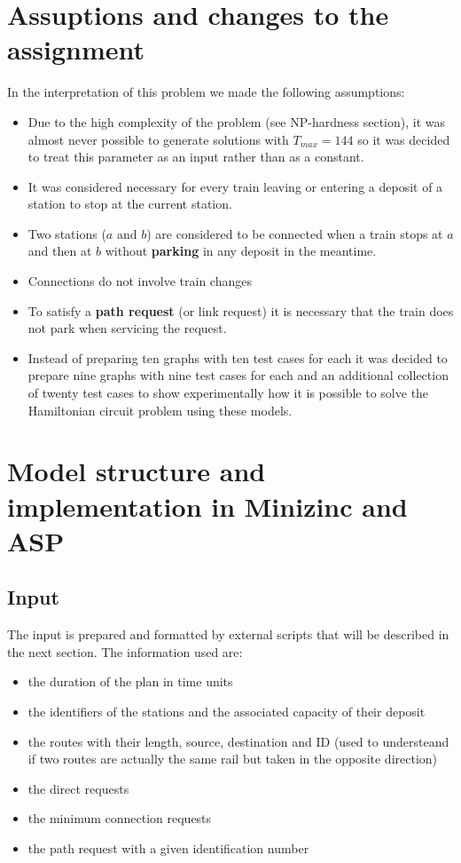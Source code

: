 \documentclass[11pt]{article}
\begin{document}
\section{Assuptions and changes to the assignment}
In the interpretation of this problem we made the following assumptions:
\begin{itemize}
\item Due to the high complexity of the problem (see NP-hardness section), it was
almost never possible to generate solutions with $T_{max}=144$ so it was decided
to treat this parameter as an input rather than as a constant.
 
\item It was considered necessary for every train leaving or entering a deposit of a station
to stop at the current station. 
\item Two stations ($a$ and $b$) are considered to be connected when a train stops at $a$
and then at $b$ without \textbf{parking} in any deposit in the meantime.
\item Connections do not involve train changes
\item To satisfy a \textbf{path request} (or link request) it is necessary that the train does 
not park when servicing the request.
\item Instead of preparing ten graphs with ten test cases for each it was decided to prepare
nine graphs with nine test cases for each and an additional collection of twenty test cases
to show experimentally how it is possible to solve the Hamiltonian circuit problem using these models.
\end{itemize}
\section{Model structure and implementation in Minizinc and ASP}
\subsection{Input}
The input is prepared and formatted by external scripts that will be described
in the next section. The information used are:
\begin{itemize}
\item the duration of the plan in time units 
\item the identifiers of the stations and the associated capacity of their deposit
\item the routes with their length, source, destination and ID (used to understeand if two routes are actually the same rail but taken in the opposite direction)
\item the direct requests
\item the minimum connection requests
\item the path request with a given identification number 
\end{itemize}
\end{document}
